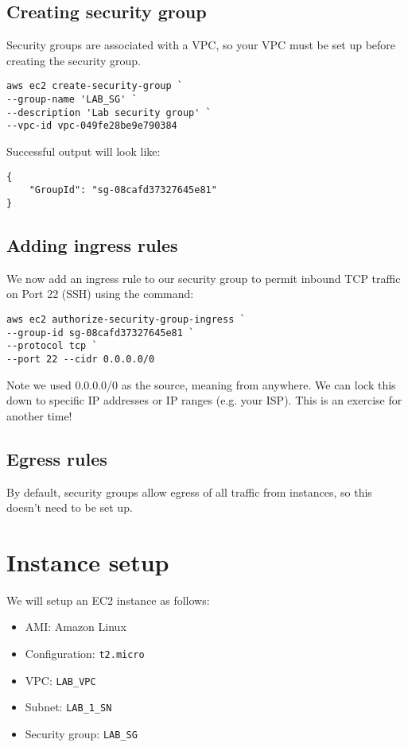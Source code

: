 \documentclass{pgnotes}
\begin{document}
\subsection{Creating security group}
\label{sec:creating-security-group}

Security groups are associated with a VPC, so your VPC must be set up before creating the security group. 
\begin{verbatim}
aws ec2 create-security-group `
--group-name 'LAB_SG' `
--description 'Lab security group' `
--vpc-id vpc-049fe28be9e790384
\end{verbatim}
Successful output will look like:
\begin{verbatim}
{
    "GroupId": "sg-08cafd37327645e81"
}
\end{verbatim}

\subsection{Adding ingress rules}

We now add an ingress rule to our security group to permit inbound TCP traffic on Port 22 (SSH) using the command: 

\begin{verbatim}
aws ec2 authorize-security-group-ingress `
--group-id sg-08cafd37327645e81 `
--protocol tcp `
--port 22 --cidr 0.0.0.0/0
\end{verbatim}

Note we used 0.0.0.0/0 as the source, meaning from anywhere.
We can lock this down to specific IP addresses or IP ranges (e.g. your ISP).
This is an exercise for another time!

\subsection{Egress rules}

By default, security groups allow egress of all traffic from instances, so this doesn't need to be set up. 


\section{Instance setup}

We will setup an EC2 instance as follows:

\begin{itemize}
\item AMI: Amazon Linux
\item Configuration: \texttt{t2.micro} 
\item VPC: \texttt{LAB\_VPC}
\item Subnet: \texttt{LAB\_1\_SN}
\item Security group: \texttt{LAB\_SG}
\end{itemize}
\end{document}
